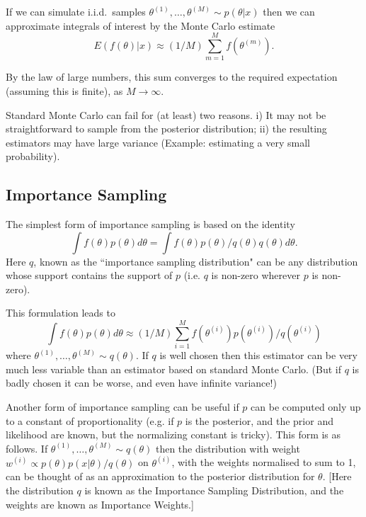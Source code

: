 \documentclass[12pt]{article}
\begin{document}
If we can simulate i.i.d.\ samples $\theta^{(1)},\dots,\theta^{(M)} \sim p(\theta | x)$
then we can approximate integrals of interest by the Monte Carlo estimate
\begin{equation*}
E(f(\theta) | x) \approx (1/M) \sum_{m=1}^M f(\theta^{(m)}).
\end{equation*}

By the law of large numbers, this sum converges to the required expectation (assuming this is finite), as $M \rightarrow \infty$.

Standard Monte Carlo can fail for (at least) two reasons.
i) It may not be straightforward to sample from the posterior distribution; ii) the resulting estimators may have large variance (Example: estimating a very small probability).
 

\subsection{Importance Sampling}
 
The simplest form of importance sampling is based on the identity
$$ \int f(\theta) p(\theta) d\theta = \int f(\theta) p(\theta)/q(\theta) q(\theta) d\theta.$$
Here $q$, known as the ``importance sampling distribution" can be any distribution whose support contains the support of $p$ (i.e. $q$ is non-zero wherever $p$ is non-zero).

This formulation leads to
$$ \int f(\theta) p(\theta) d\theta \approx
(1/M) \sum_{i=1}^M f(\theta^{(i)}) p(\theta^{(i)})/q(\theta^{(i)})$$
where $\theta^{(1)},\dots,\theta^{(M)} \sim q(\theta)$.
If $q$ is well chosen then this estimator can be very much less variable than an estimator based on
standard Monte Carlo. (But if $q$ is badly chosen it can be worse, and even have infinite variance!)

Another form of importance sampling can be useful if
$p$ can be computed only up to a constant of proportionality (e.g. if $p$ is the posterior, and the prior and likelihood are known, but the normalizing constant is tricky). This form is as follows.
If $\theta^{(1)},\dots,\theta^{(M)} \sim q(\theta)$  then the distribution with weight
$w^{(i)} \propto p(\theta) p(x|\theta) / q(\theta)$ on $\theta^{(i)}$, with the weights normalised
to sum to 1, can be thought of
as an approximation to the posterior distribution for $\theta$. [Here the distribution
$q$ is known as the Importance Sampling Distribution, and the weights are known
as Importance Weights.]
\end{document}
